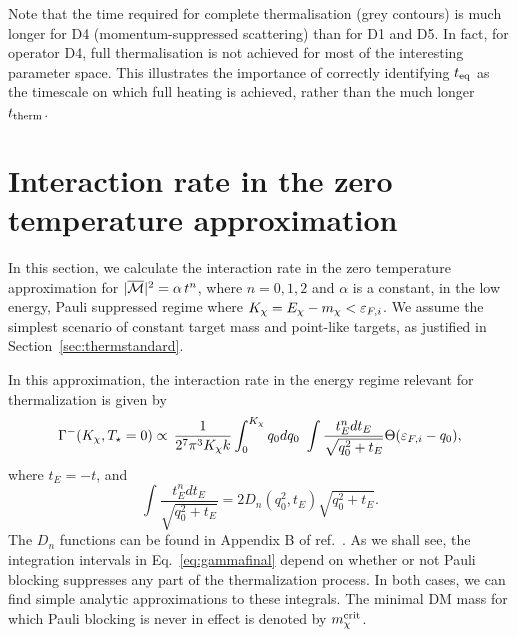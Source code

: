 Note that the time required for complete thermalisation (grey contours) is much longer for D4 (momentum-suppressed scattering) than for D1 and D5. In fact, for operator D4, full thermalisation is not achieved for most of the interesting parameter space. This illustrates the importance of correctly identifying $t_{\rm eq}$ as the timescale on which full heating is achieved, rather than the much longer $t_{\rm therm}$. 



\section{Interaction rate in the zero temperature approximation}
\label{sec:pauliblockingle}



In this section,  we calculate the interaction rate in the zero temperature approximation for $|\overline{\mathcal M}|^2 = \alpha \, t^n$, where $n=0,1,2$ and $\alpha$ is a constant, in the low energy, Pauli suppressed regime where $K_\chi=E_\chi-m_\chi<\varepsilon_{F,i}$. 
We assume the simplest scenario of constant target mass and point-like targets, as justified in Section~\ref{sec:thermstandard}. 

In this approximation, the interaction rate in the energy regime relevant for thermalization is given by~\cite{Bell:2020jou_sep_ImprovedTreatmentDark}
\begin{equation}
\Gamma^{-}(K_\chi,T_\star=0) \propto \, \frac{1}{2^7\pi^3 K_\chi k }  \int_0^{K_\chi} q_0 dq_0 \,\, \int \frac{t_E^n dt_E }{\sqrt{q_0^2+t_E}}\Theta(\varepsilon_{F,i}-q_0),
\label{eq:gammafinal}
\end{equation}
where $t_E=-t$,   and 
\begin{equation}
\int \frac{t_E^n dt_E }{\sqrt{q_0^2+t_E}} = 2D_n(q_0^2,t_E)\sqrt{q_0^2+t_E}.
\end{equation}
The $D_n$  functions can be found in Appendix B of  ref.~\cite{Bell:2020jou_sep_ImprovedTreatmentDark}. 
As we shall see, the integration intervals in Eq.~\ref{eq:gammafinal} depend on whether or not Pauli blocking suppresses any part of the thermalization process.
In both cases, we can find simple analytic approximations to these integrals. 
The minimal DM mass for which Pauli blocking is never in effect is denoted by $m_\chi^{\rm crit}$. 
  
